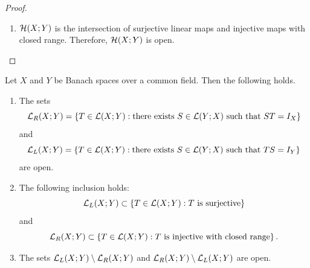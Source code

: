\documentclass[a4paper]{article}
\begin{document}
\begin{proof}
\begin{enumerate}
    \item $\mathcal{H}(X; Y)$ is the intersection of surjective linear
          maps and injective maps with closed range. Therefore,
          $\mathcal{H}(X; Y)$ is open.
  \end{enumerate}

\end{proof}

\begin{thm}
  Let $X$ and $Y$ be Banach spaces over a common field. Then the following
  holds.
  \begin{enumerate}
    \item The sets
          \[
            \mathcal{L}_R(X; Y) = \left\{ T \in \mathcal{L}(X; Y) : \text{there exists $S \in \mathcal{L}(Y; X)$ such that $ST = I_X$} \right\}
          \]
          and
          \[
            \mathcal{L}_L(X; Y) = \left\{ T \in \mathcal{L}(X; Y) : \text{there exists $S \in \mathcal{L}(Y; X)$ such that $TS = I_Y$} \right\}
          \]
          are open.
    \item The following inclusion holds:
          \[
            \mathcal{L}_L(X; Y) \subset \left\{ T \in \mathcal{L}(X; Y) : \text{$T$ is surjective} \right\}
          \]
          and
          \[
            \mathcal{L}_R(X; Y) \subset \left\{ T \in \mathcal{L}(X; Y) : \text{$T$ is injective with closed range} \right\}.
          \]
    \item The sets $\mathcal{L}_L(X; Y) \setminus \mathcal{L}_R(X; Y)$ and $\mathcal{L}_R(X; Y)
          \setminus \mathcal{L}_L(X; Y)$ are open.
  \end{enumerate}
\end{thm}
\end{document}
